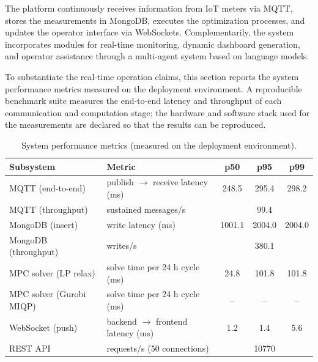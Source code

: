 \documentclass[journal,article,submit,pdftex,moreauthors]{Definitions/mdpi}
\begin{document}
The platform continuously receives information from IoT meters via MQTT, stores the measurements in MongoDB, executes the optimization processes, and updates the operator interface via WebSockets. Complementarily, the system incorporates modules for real-time monitoring, dynamic dashboard generation, and operator assistance through a multi-agent system based on language models.

To substantiate the real-time operation claims, this section reports the system performance metrics measured on the deployment environment. A reproducible benchmark suite measures the end-to-end latency and throughput of each communication and computation stage; the hardware and software stack used for the measurements are declared so that the results can be reproduced.

\begin{table}[H]
    \centering
    \caption{System performance metrics (measured on the deployment environment).}
    \label{tab:performance}
    \begin{tabular}{llccc}
        \toprule
        \textbf{Subsystem} & \textbf{Metric} & \textbf{p50} & \textbf{p95} & \textbf{p99} \\
        \midrule
        MQTT (end-to-end)   & publish $\rightarrow$ receive latency (ms) & 248.5 & 295.4 & 298.2 \\
        MQTT (throughput)   & sustained messages/s                     & \multicolumn{3}{c}{99.4} \\
        MongoDB (insert)    & write latency (ms)                       & 1001.1 & 2004.0 & 2004.0 \\
        MongoDB (throughput)& writes/s                                   & \multicolumn{3}{c}{380.1} \\
        MPC solver (LP relax) & solve time per 24 h cycle (ms)        & 24.8 & 101.8 & 101.8 \\
        MPC solver (Gurobi MIQP) & solve time per 24 h cycle (ms)    & -- & -- & -- \\
        WebSocket (push)    & backend $\rightarrow$ frontend latency (ms) & 1.2 & 1.4 & 5.6 \\
        REST API            & requests/s (50 connections)              & \multicolumn{3}{c}{10770} \\
        \bottomrule
    \end{tabular}
\end{table}
\end{document}
